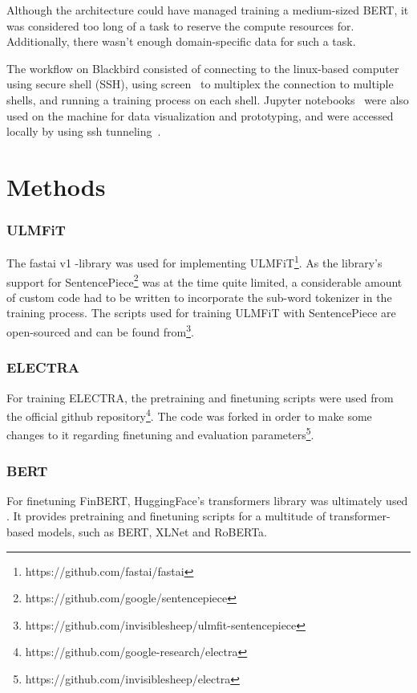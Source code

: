 Although the architecture could have managed training a medium-sized BERT, it was considered too long of a task to reserve the compute resources for.
Additionally, there wasn't enough domain-specific data for such a task.


The workflow on Blackbird consisted of connecting to the linux-based computer using secure shell (SSH), using screen~\cite{zotero-180} to multiplex the connection to multiple shells, and running a training process on each shell.
Jupyter notebooks~\cite{zotero-182} were also used on the machine for data visualization and prototyping, and were accessed locally by using ssh tunneling~\cite{zotero-184}.

\section{Methods}\label{Methods}
\subsubsection{ULMFiT}\label{ULMFiT}
The fastai v1 -library was used for implementing ULMFiT\footnote{https://github.com/fastai/fastai}.
As the library's support for SentencePiece\footnote{https://github.com/google/sentencepiece} was at the time quite limited, a considerable amount of custom code had to be written to incorporate the sub-word tokenizer in the training process.
The scripts used for training ULMFiT with SentencePiece are open-sourced and can be found from\footnote{https://github.com/invisiblesheep/ulmfit-sentencepiece}.

\subsubsection{ELECTRA}\label{ELECTRA}
For training ELECTRA, the pretraining and finetuning scripts were used from the official github repository\footnote{https://github.com/google-research/electra}.
The code was forked in order to make some changes to it regarding finetuning and evaluation parameters\footnote{https://github.com/invisiblesheep/electra}.

\subsubsection{BERT}\label{BERT}
For finetuning FinBERT, HuggingFace's transformers library was ultimately used \cite{wolf2020}.
It provides pretraining and finetuning scripts for a multitude of transformer-based models, such as BERT, XLNet and RoBERTa.

